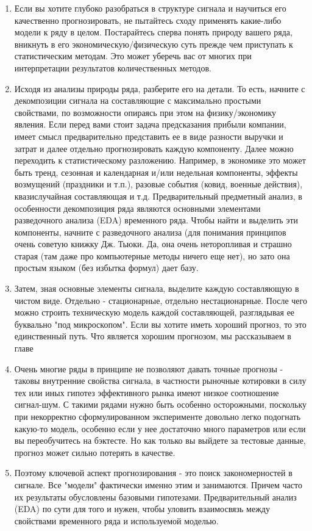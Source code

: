 \begin{enumerate}
  \item Если вы хотите глубоко разобраться в структуре
    сигнала и научиться его качественно прогнозировать, не пытайтесь
    сходу применять какие-либо модели к ряду в целом. Постарайтесь сперва
    понять природу вашего ряда, вникнуть в его
    экономическую/физическую суть прежде чем приступать к
    статистическим методам. Это может уберечь вас от многих при
    интерпретации результатов количественных методов.
  \item Исходя из анализы природы ряда, разберите его на
    детали. То есть, начните с декомпозиции сигнала на составляющие с
    максимально простыми свойствами, по возможности опираясь при этом на
    физику/экономику явления. Если перед вами стоит задача
    предсказания прибыли компании, имеет смысл предварительно
    представить ее в виде разности выручки и затрат и далее отдельно
    прогнозировать каждую компоненту. Далее можно переходить к
    статистическому разложению. Например, в экономике это может быть
    тренд, сезонная и календарная и/или недельная компоненты, эффекты возмущений
    (праздники и т.п.), разовые события (ковид, военные действия),
    квазислучайная составляющая и т.д. Предварительный предметный
    анализ, в особенности декомпозиция ряда являются основными
    элементами разведочного анализа (EDA) временного ряда.
    Чтобы найти и выделить эти компоненты, начните с разведочного
    анализа (для понимания
      принципов очень советую книжку
      Дж. Тьюки. Да, она очень неторопливая и страшно старая (там даже про
      компьютерные методы ничего еще нет), но зато она простым языком (без
      избытка формул) дает базу.
    \item Затем, зная основные элементы сигнала, выделите каждую
      составляющую в чистом виде. Отдельно - стационарные, отдельно
      нестационарные. После чего можно строить техническую модель каждой
      составляющей, разглядывая ее буквально "под микроскопом". Если вы
      хотите иметь хороший прогноз, то это единственный путь. Что
      является хорошим прогнозом, мы рассказываем в главе

    \item Очень многие ряды в принципе не позволяют давать точные
      прогнозы - таковы внутренние свойства сигнала, в частности
      рыночные котировки в силу тех или иных гипотез эффективного
      рынка имеют низкое соотношение сигнал-шум. С такими рядами
      нужно быть особенно осторожными, поскольку при некорректно
      сформулированном эксперименте довольно легко подогнать
      какую-то модель, особенно если у нее достаточно много
      параметров или если вы переобучитесь на
      бэктесте. Но как только вы выйдете за тестовые данные, прогноз
      может сильно потерять в качестве.
    \item Поэтому ключевой аспект прогнозирования - это поиск
      закономерностей в сигнале. Все "модели" фактически именно этим
      и занимаются. Причем часто их
      результаты обусловлены базовыми гипотезами. Предварительный
      анализ (EDA) по сути для того и нужен, чтобы уловить
      взаимосвязь между свойствами временного ряда и используемой моделью.


\end{enumerate}
